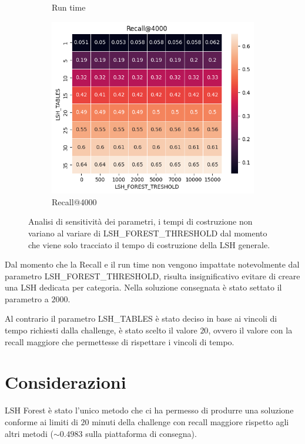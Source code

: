 \begin{figure}[!h]
\begin{subfigure}{.5\textwidth}
      \caption{Run time}
      \label{fig:run_time}
    \end{subfigure}
    \begin{subfigure}{.5\textwidth}
      \centering
      \includegraphics[width=.8\linewidth]{img/recall.png}
      \caption{Recall@4000}
      \label{fig:recall}
    \end{subfigure}
    \caption{Analisi di sensitività dei parametri, i tempi di costruzione non 
    variano al variare di LSH\_FOREST\_THRESHOLD dal momento che viene solo tracciato 
    il tempo di costruzione della LSH generale.}
    \label{fig:sensitivity}
\end{figure}

Dal momento che la Recall e il run time non vengono impattate notevolmente dal
parametro LSH\_FOREST\_THRESHOLD, risulta insignificativo evitare di creare una 
LSH dedicata per categoria. Nella soluzione consegnata è stato settato il 
parametro a $2000$.

Al contrario il parametro LSH\_TABLES è stato deciso in base ai vincoli di tempo 
richiesti dalla challenge, è stato scelto il valore $20$, ovvero il valore con la 
recall maggiore che permettesse di rispettare i vincoli di tempo. 




\section{Considerazioni}
LSH Forest è stato l'unico metodo che ci ha permesso di produrre una soluzione 
conforme ai limiti di $20$ minuti della challenge con recall maggiore rispetto
agli altri metodi ($\sim 0.4983$ sulla piattaforma di consegna). 

